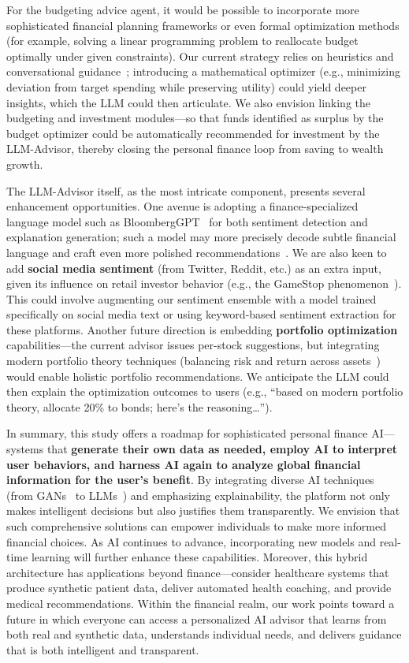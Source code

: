 \documentclass[conference]{IEEEtran}
\begin{document}
For the budgeting advice agent, it would be possible to incorporate more sophisticated financial planning frameworks or even formal optimization methods (for example, solving a linear programming problem to reallocate budget optimally under given constraints). Our current strategy relies on heuristics and conversational guidance~\cite{b8}; introducing a mathematical optimizer (e.g., minimizing deviation from target spending while preserving utility) could yield deeper insights, which the LLM could then articulate. We also envision linking the budgeting and investment modules—so that funds identified as surplus by the budget optimizer could be automatically recommended for investment by the LLM-Advisor, thereby closing the personal finance loop from saving to wealth growth.

The LLM-Advisor itself, as the most intricate component, presents several enhancement opportunities. One avenue is adopting a finance-specialized language model such as BloombergGPT~\cite{b7} for both sentiment detection and explanation generation; such a model may more precisely decode subtle financial language and craft even more polished recommendations~\cite{bloomberggpt2023}. We are also keen to add \textbf{social media sentiment} (from Twitter, Reddit, etc.) as an extra input, given its influence on retail investor behavior (e.g., the GameStop phenomenon~\cite{fieberg2023}). This could involve augmenting our sentiment ensemble with a model trained specifically on social media text or using keyword-based sentiment extraction for these platforms. Another future direction is embedding \textbf{portfolio optimization} capabilities—the current advisor issues per-stock suggestions, but integrating modern portfolio theory techniques (balancing risk and return across assets~\cite{alobaidi2022}) would enable holistic portfolio recommendations. We anticipate the LLM could then explain the optimization outcomes to users (e.g., “based on modern portfolio theory, allocate 20\% to bonds; here’s the reasoning…”).

In summary, this study offers a roadmap for sophisticated personal finance AI—systems that \textbf{generate their own data as needed, employ AI to interpret user behaviors, and harness AI again to analyze global financial information for the user’s benefit}. By integrating diverse AI techniques (from GANs~\cite{ctgan2019} to LLMs~\cite{brown2020}) and emphasizing explainability, the platform not only makes intelligent decisions but also justifies them transparently. We envision that such comprehensive solutions can empower individuals to make more informed financial choices. As AI continues to advance, incorporating new models and real-time learning will further enhance these capabilities. Moreover, this hybrid architecture has applications beyond finance—consider healthcare systems that produce synthetic patient data, deliver automated health coaching, and provide medical recommendations. Within the financial realm, our work points toward a future in which everyone can access a personalized AI advisor that learns from both real and synthetic data, understands individual needs, and delivers guidance that is both intelligent and transparent.
\end{document}
